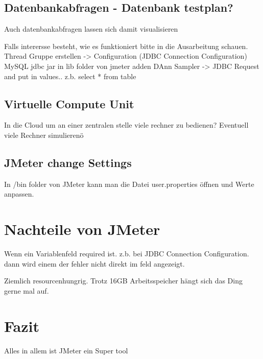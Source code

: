 \documentclass[a4paper,12pt]{article}
\begin{document}
\subsection{Datenbankabfragen - Datenbank testplan?}
Auch datenbankabfragen lassen sich damit visualisieren

Falls interersse besteht, wie es funktioniert bitte in die Ausarbeitung schauen.
Thread Gruppe erstellen -> Configuration (JDBC Connection Configuration)
MySQL jdbc jar in lib folder von jmeter adden 
DAnn Sampler -> JDBC Request and put in values.. z.b. select * from table


\subsection{Virtuelle Compute Unit}
In die Cloud um an einer zentralen stelle viele rechner zu bedienen?
Eventuell viele Rechner simulierenö

\subsection{JMeter change Settings}
In /bin folder von JMeter kann man die Datei user.properties öffnen und Werte anpassen.

\section{Nachteile von JMeter}
Wenn ein Variablenfeld required ist. z.b. bei JDBC Connection Configuration. dann wird einem der fehler nicht direkt im feld angezeigt.

Ziemlich resourcenhungrig. Trotz 16GB Arbeitsspeicher hängt sich das Ding gerne mal auf.
\section{Fazit}
Alles in allem ist JMeter ein Super tool

\pagebreak


\end{document}
